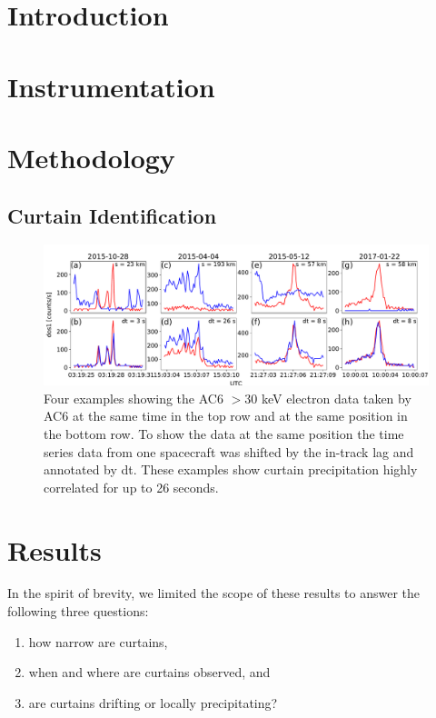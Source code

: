 \documentclass[draft]{agujournal2019}
\begin{document}
\section{Introduction}

\section{Instrumentation} \label{instrumentation}

\section{Methodology} 
\subsection{Curtain Identification} \label{curtain_identification}

\begin{figure}
\includegraphics[width=\textwidth]{fig1.pdf}
\caption{Four examples showing the AC6 $> 30$ keV electron data taken by AC6 at the same time in the top row and at the same position in the bottom row. To show the data at the same position the time series data from one spacecraft was shifted by the in-track lag and annotated by dt. These examples show curtain precipitation highly correlated for up to 26 seconds.}
\label{fig1}
\end{figure}

\section{Results} \label{results}
In the spirit of brevity, we limited the scope of these results to answer the following three questions:

\begin{enumerate}
\item how narrow are curtains,
\item when and where are curtains observed, and
\item are curtains drifting or locally precipitating?
\end{enumerate}
\end{document}
